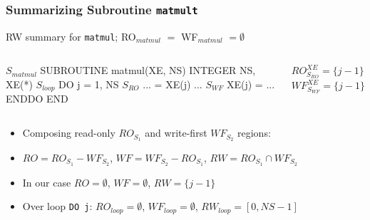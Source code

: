 \documentclass{beamer}
\renewcommand{\emph}[1]{\textcolor{structure}{#1}}
\newcommand{\emp}[1]{\textcolor{DikuRed}{ #1}}
\newcommand{\mymath}[1]{$ #1 $}
\newcommand{\myindx}[1]{_{#1}}
\newcommand{\myindu}[1]{^{#1}}
\begin{document}

\begin{frame}[fragile,t]
  \frametitle{Summarizing Subroutine {\tt matmult}}

\begin{block}{RW summary for {\tt matmul}; RO$_{matmul}$ $=$ WF$_{matmul}$ $= \emptyset$ } \vspace{-1ex}
\begin{columns} 
\begin{colorcode}[fontsize=\scriptsize]
\mymath{S\myindx{matmul}}  SUBROUTINE matmul(XE, NS)
          INTEGER NS, XE(*)
\mymath{S\myindx{loop}}       \emph{DO j = 1, NS}
\mymath{S\myindx{RO}}          \alert{...   \hspace{0.5ex}= XE(j) ...}
\mymath{S\myindx{WF}}          \alert{XE(j) = ...}
          \emph{ENDDO}
        END
\end{colorcode}
\begin{colorcode}[fontsize=\scriptsize]




\alert{\mymath{RO\myindu{XE}\myindx{S\myindx{RO}} = \{j-1\}}}
\alert{\mymath{WF\myindu{XE}\myindx{S\myindx{WF}} = \{j-1\}}}
\end{colorcode}
\end{columns}
\end{block}

\bigskip

\begin{itemize}
    \item Composing read-only $RO_{S_1}$ and write-first $WF_{S_2}$ regions:  \smallskip
    \item $RO = RO_{S_1} - WF_{S_2}$, $WF = WF_{S_2} - RO_{S_1}$, $RW = RO_{S_1} \cap WF_{S_2}$  \smallskip
    \item In our case $RO = \emptyset$, $WF = \emptyset$, \emp{$RW = \{j-1\}$}  \smallskip
    \item Over loop {\tt DO j}:  $RO_{loop} = \emptyset$, $WF_{loop} = \emptyset$, \emph{$RW_{loop} = [0, NS-1]$}  \smallskip
\end{itemize}
\end{frame}


\end{document}
